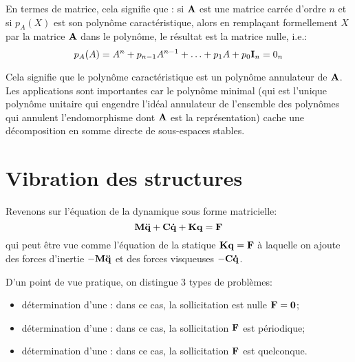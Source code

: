 En termes de matrice, cela signifie que : si $\MM{A}$ est une matrice carrée d'ordre $n$ et si 
$p_A(X)$ est son polynôme caractéristique, alors en remplaçant formellement 
$X$ par la matrice $\MM{A}$ dans le polynôme, le résultat est la matrice nulle, i.e.:
\begin{equation}p_A(A)= A^n + p_{n-1}A^{n-1} + \ldots + p_1 A + p_0 \MM{I}_n = 0_n \end{equation}

Cela signifie que le polynôme caractéristique est un 
polynôme annulateur de $\MM{A}$.
Les applications sont importantes car le polynôme minimal (qui est l'unique polynôme unitaire qui
engendre l'idéal annulateur de l'ensemble des polynômes qui annulent l'endomorphisme dont $\MM{A}$
est la représentation) cache une décomposition en somme  directe de sous-espaces stables. 










\medskip
\section{Vibration des structures}

\medskip
Revenons sur l'équation de la dynamique sous forme matricielle:
\begin{equation} \MM{M}\VV{\ddot{q}}+\MM{C}\VV{\dot{q}}+\MM{K}\VV{q}=\VV{F} \end{equation}
qui peut être vue comme l'équation de la statique $\MM{K}\VV{q}=\VV{F}$ à laquelle on
ajoute des forces d'inertie $-\MM{M}\VV{\ddot{q}}$ et des forces visqueuses
$-\MM{C}\VV{\dot{q}}$.

\medskip
D'un point de vue pratique, on distingue 3 types de problèmes:
\begin{itemize}
   \item détermination d'une : 
	dans ce cas, la sollicitation est nulle $\VV{F} = \VV{0}$;
   \item détermination d'une :
 	dans ce cas, la sollicitation $\VV{F}$ est périodique;
   \item détermination d'une : 
	dans ce cas, la sollicitation $\VV{F}$ est quelconque.
\end{itemize}


